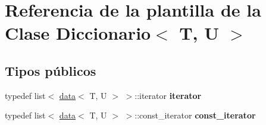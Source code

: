 \hypertarget{classDiccionario}{}\section{Referencia de la plantilla de la Clase Diccionario$<$ T, U $>$}
\label{classDiccionario}
\subsection*{Tipos públicos}
\begin{DoxyCompactItemize}
\item 
\mbox{\label{classDiccionario_a18a48dcc727d1b8c7f5039156a5f31f8}} 
typedef list$<$ \hyperlink{structdata}{data}$<$ T, U $>$ $>$\+::iterator {\bfseries iterator}
\item 
\mbox{\label{classDiccionario_a0e65b53de6bb47d26bb38e77cdb44712}} 
typedef list$<$ \hyperlink{structdata}{data}$<$ T, U $>$ $>$\+::const\+\_\+iterator {\bfseries const\+\_\+iterator}
\end{DoxyCompactItemize}
